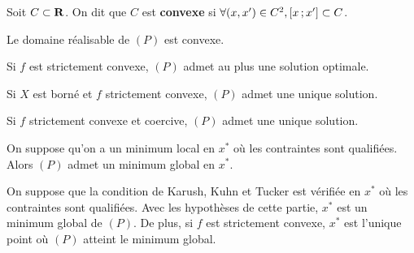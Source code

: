     \begin{defn}
        Soit $C \subset \mathbf{R}$.
        On dit que $C$ est \textbf{convexe} si $\forall (x,x') \in C^2, \mathopen{}\mathclose{\left[x\mathclose{}\mathpunct{};x'\right]} \subset C$.
    \end{defn}

    \begin{rem}
        Le domaine réalisable de $(P)$ est convexe.
    \end{rem}

    \begin{thm}
        Si $f$ est strictement convexe, $(P)$ admet au plus une solution optimale.
    \end{thm}

    \begin{thm}
        Si $X$ est borné et $f$ strictement convexe, $(P)$ admet une unique solution.
    \end{thm}

    \begin{thm}
        Si $f$ strictement convexe et coercive, $(P)$ admet une unique solution.
    \end{thm}

    \begin{thm}
        On suppose qu'on a un minimum local en $x^*$ où les contraintes sont qualifiées.
        Alors $(P)$ admet un minimum global en $x^*$.
    \end{thm}

    \begin{thm}
        On suppose que la condition de Karush, Kuhn et Tucker est vérifiée en $x^*$ où les contraintes sont qualifiées.
        Avec les hypothèses de cette partie, $x^*$ est un minimum global de $(P)$.
        De plus, si $f$ est strictement convexe, $x^*$ est l'unique point où $(P)$ atteint le minimum global.
    \end{thm}